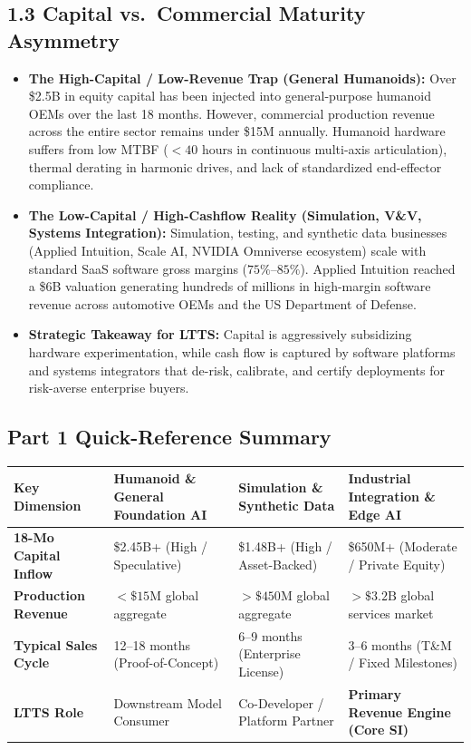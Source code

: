 \documentclass[11pt,a4paper]{article}
\begin{document}
\subsection{1.3 Capital vs.\ Commercial Maturity Asymmetry}
\begin{itemize}
    \item \textbf{The High-Capital / Low-Revenue Trap (General Humanoids):} Over \$2.5B in equity capital has been injected into general-purpose humanoid OEMs over the last 18 months. However, commercial production revenue across the entire sector remains under \$15M annually. Humanoid hardware suffers from low MTBF ($<40\text{ hours}$ in continuous multi-axis articulation), thermal derating in harmonic drives, and lack of standardized end-effector compliance.
    \item \textbf{The Low-Capital / High-Cashflow Reality (Simulation, V\&V, Systems Integration):} Simulation, testing, and synthetic data businesses (Applied Intuition, Scale AI, NVIDIA Omniverse ecosystem) scale with standard SaaS software gross margins ($75\%\text{--}85\%$). Applied Intuition reached a \$6B valuation generating hundreds of millions in high-margin software revenue across automotive OEMs and the US Department of Defense.
    \item \textbf{Strategic Takeaway for LTTS:} Capital is aggressively subsidizing hardware experimentation, while cash flow is captured by software platforms and systems integrators that de-risk, calibrate, and certify deployments for risk-averse enterprise buyers.
\end{itemize}

\subsection*{Part 1 Quick-Reference Summary}
\begin{table}[h!]
\centering
\scriptsize
\begin{tabularx}{\textwidth}{@{}l X X X@{}}
\toprule
\textbf{Key Dimension} & \textbf{Humanoid \& General Foundation AI} & \textbf{Simulation \& Synthetic Data} & \textbf{Industrial Integration \& Edge AI} \\
\midrule
\textbf{18-Mo Capital Inflow} & \$2.45B+ (High / Speculative) & \$1.48B+ (High / Asset-Backed) & \$650M+ (Moderate / Private Equity) \\
\textbf{Production Revenue} & $<\$15\text{M}$ global aggregate & $>\$450\text{M}$ global aggregate & $>\$3.2\text{B}$ global services market \\
\textbf{Typical Sales Cycle} & 12--18 months (Proof-of-Concept) & 6--9 months (Enterprise License) & 3--6 months (T\&M / Fixed Milestones) \\
\textbf{LTTS Role} & Downstream Model Consumer & Co-Developer / Platform Partner & \textbf{Primary Revenue Engine (Core SI)} \\
\bottomrule
\end{tabularx}
\end{table}
\end{document}
